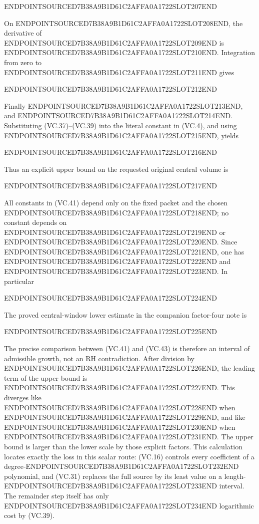 ENDPOINTSOURCED7B38A9B1D61C2AFFA0A1722SLOT207END

On ENDPOINTSOURCED7B38A9B1D61C2AFFA0A1722SLOT208END, the derivative of ENDPOINTSOURCED7B38A9B1D61C2AFFA0A1722SLOT209END is ENDPOINTSOURCED7B38A9B1D61C2AFFA0A1722SLOT210END. Integration from zero to ENDPOINTSOURCED7B38A9B1D61C2AFFA0A1722SLOT211END gives

ENDPOINTSOURCED7B38A9B1D61C2AFFA0A1722SLOT212END

Finally ENDPOINTSOURCED7B38A9B1D61C2AFFA0A1722SLOT213END, and ENDPOINTSOURCED7B38A9B1D61C2AFFA0A1722SLOT214END. Substituting (VC.37)--(VC.39) into the literal constant in (VC.4), and using ENDPOINTSOURCED7B38A9B1D61C2AFFA0A1722SLOT215END, yields

ENDPOINTSOURCED7B38A9B1D61C2AFFA0A1722SLOT216END

Thus an explicit upper bound on the requested original central volume is

ENDPOINTSOURCED7B38A9B1D61C2AFFA0A1722SLOT217END

All constants in (VC.41) depend only on the fixed packet and the chosen ENDPOINTSOURCED7B38A9B1D61C2AFFA0A1722SLOT218END; no constant depends on ENDPOINTSOURCED7B38A9B1D61C2AFFA0A1722SLOT219END or ENDPOINTSOURCED7B38A9B1D61C2AFFA0A1722SLOT220END. Since ENDPOINTSOURCED7B38A9B1D61C2AFFA0A1722SLOT221END, one has ENDPOINTSOURCED7B38A9B1D61C2AFFA0A1722SLOT222END and ENDPOINTSOURCED7B38A9B1D61C2AFFA0A1722SLOT223END. In particular

ENDPOINTSOURCED7B38A9B1D61C2AFFA0A1722SLOT224END

The proved central-window lower estimate in the companion factor-four note is

ENDPOINTSOURCED7B38A9B1D61C2AFFA0A1722SLOT225END

The precise comparison between (VC.41) and (VC.43) is therefore an interval of admissible growth, not an RH contradiction. After division by ENDPOINTSOURCED7B38A9B1D61C2AFFA0A1722SLOT226END, the leading term of the upper bound is ENDPOINTSOURCED7B38A9B1D61C2AFFA0A1722SLOT227END. This diverges like ENDPOINTSOURCED7B38A9B1D61C2AFFA0A1722SLOT228END when ENDPOINTSOURCED7B38A9B1D61C2AFFA0A1722SLOT229END, and like ENDPOINTSOURCED7B38A9B1D61C2AFFA0A1722SLOT230END when ENDPOINTSOURCED7B38A9B1D61C2AFFA0A1722SLOT231END. The upper bound is larger than the lower scale by those explicit factors. This calculation locates exactly the loss in this scalar route: (VC.16) controls every coefficient of a degree-ENDPOINTSOURCED7B38A9B1D61C2AFFA0A1722SLOT232END polynomial, and (VC.31) replaces the full source by its least value on a length-ENDPOINTSOURCED7B38A9B1D61C2AFFA0A1722SLOT233END interval. The remainder step itself has only ENDPOINTSOURCED7B38A9B1D61C2AFFA0A1722SLOT234END logarithmic cost by (VC.39).

